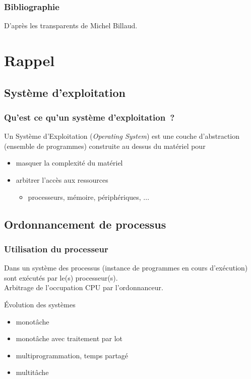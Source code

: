 \begin{frame}
\frametitle{Bibliographie}

\small
\nocite{*}    
 
\vspace{0.5cm}    
D'après les transparents de Michel Billaud.
\end{frame}

\section{Rappel}
\subsection{Système d'exploitation}
\begin{frame}
\frametitle{Qu'est ce qu'un système d'exploitation~?}
Un \alert{Système d'Exploitation} (\emph{Operating System}) est une
\alert{couche d'abstraction} (ensemble de programmes) construite au dessus du matériel pour
\begin{itemize}
\item masquer la complexité du matériel
\item arbitrer l'accès aux ressources
\begin{itemize}
\item \normalsize{processeurs, mémoire, périphériques, ...}
\end{itemize}
\end{itemize}
\end{frame}

\subsection{Ordonnancement de processus}
\begin{frame}
\frametitle{Utilisation du processeur}
Dans un système des \alert{processus} (instance de programmes en cours d'exécution) 
sont exécutés par le(s) processeur(s). \\
\vspace{0.5cm}
Arbitrage de l'occupation CPU par l'\alert{ordonnanceur}. 
\vspace{0.5cm}

Évolution des systèmes
\begin{itemize}
\item monotâche
\item monotâche avec traitement par lot
\item multiprogrammation, temps partagé
\item multitâche
\end{itemize}
\end{frame}


